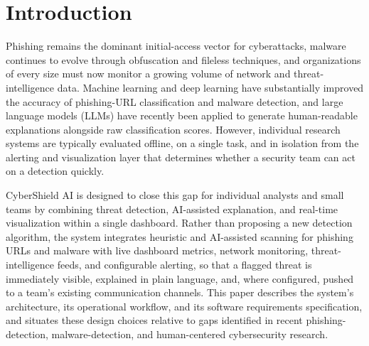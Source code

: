 \documentclass[conference]{IEEEtran}
\begin{document}
\section{Introduction}
Phishing remains the dominant initial-access vector for cyberattacks, malware continues to evolve through obfuscation and fileless techniques, and organizations of every size must now monitor a growing volume of network and threat-intelligence data. Machine learning and deep learning have substantially improved the accuracy of phishing-URL classification and malware detection, and large language models (LLMs) have recently been applied to generate human-readable explanations alongside raw classification scores. However, individual research systems are typically evaluated offline, on a single task, and in isolation from the alerting and visualization layer that determines whether a security team can act on a detection quickly.

CyberShield AI is designed to close this gap for individual analysts and small teams by combining threat detection, AI-assisted explanation, and real-time visualization within a single dashboard. Rather than proposing a new detection algorithm, the system integrates heuristic and AI-assisted scanning for phishing URLs and malware with live dashboard metrics, network monitoring, threat-intelligence feeds, and configurable alerting, so that a flagged threat is immediately visible, explained in plain language, and, where configured, pushed to a team's existing communication channels. This paper describes the system's architecture, its operational workflow, and its software requirements specification, and situates these design choices relative to gaps identified in recent phishing-detection, malware-detection, and human-centered cybersecurity research.
\end{document}
